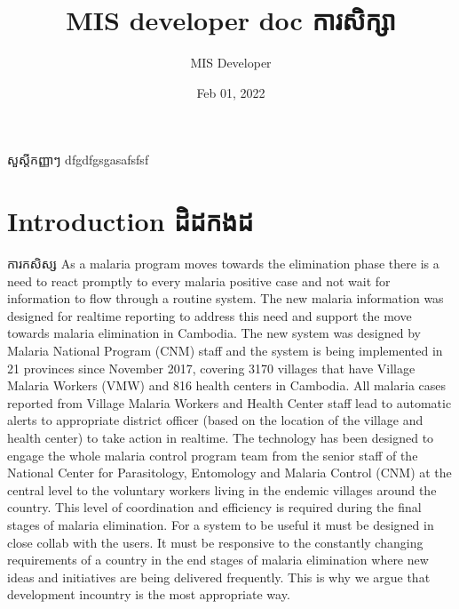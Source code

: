 \documentclass[letterpaper,10pt,english,khmer,openany,oneside]{sphinxmanual}
\title{MIS developer doc ការសិក្សា}
\date{Feb 01, 2022}
\author{MIS Developer}
\let\sphinxpxdimen\pdfpxdimen\else\newdimen\sphinxpxdimen
\begin{document}
	សួស្តីកញ្ញាៗ dfgdfgsgasafsfsf
	
	\pagestyle{empty}
	\sphinxmaketitle
	\pagestyle{plain}
	\sphinxtableofcontents
	\pagestyle{normal}
	\label{\detokenize{index::doc}}
	
	
	
	\chapter{Introduction {ដិដកងដ}}
	\label{\detokenize{about/about-mis:introduction}}\label{\detokenize{about/about-mis::doc}}
	\noindent{\hspace*{\fill}\sphinxincludegraphics[width=100\sphinxpxdimen]{{cnm}.png}\hspace*{\fill}}
	
	\sphinxAtStartPar
	ការកសិស្ស
	As a malaria program moves towards the elimination phase there is a need to react promptly to every malaria positive case and not wait for information to flow through a routine system. The new malaria information was designed for real\sphinxhyphen{}time reporting to address this need and support the move towards malaria elimination in Cambodia.
	The new system was designed by Malaria National Program (CNM) staff and the system is being implemented in 21 provinces since November 2017, covering 3170 villages that have Village Malaria Workers (VMW) and 816 health centers in Cambodia. All malaria cases reported from Village Malaria Workers and Health Center staff lead to automatic alerts to appropriate district officer (based on the location of the village and health center) to take action in real\sphinxhyphen{}time.
	The technology has been designed to engage the whole malaria control program team from the senior staff of the National Center for Parasitology, Entomology and Malaria Control (CNM) at the central level to the voluntary workers living in the endemic villages around the country. This level of coordination and efficiency is required during the final stages of malaria elimination.
	For a system to be useful it must be designed in close collab with the users. It must be responsive to the constantly changing requirements of a country in the end stages of malaria elimination where new ideas and initiatives are being delivered frequently. This is why we argue that development in\sphinxhyphen{}country is the most appropriate way.
	
\end{document}
